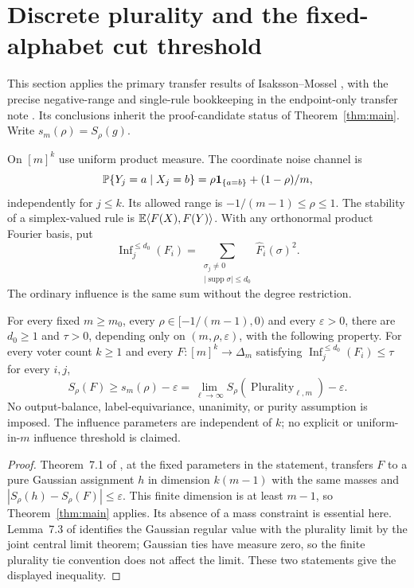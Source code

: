 \section{Discrete plurality and the fixed-alphabet cut threshold}
\label{sec:discrete}
This section applies the primary transfer results of Isaksson--Mossel
\cite{IM}, with the precise negative-range and single-rule bookkeeping
in the endpoint-only transfer note \cite{endpointtransfer}. Its conclusions inherit the
proof-candidate status of Theorem~\ref{thm:main}.
Write $s_m(\rho)=S_\rho(g)$.

On $[m]^k$ use uniform product measure. The coordinate noise channel is
\begin{equation}\label{eq:discrete-channel}
 \mathbb P\{Y_j=a\mid X_j=b\}
       =\rho\mathbf 1_{\{a=b\}}+(1-\rho)/m,
\end{equation}
independently for $j\le k$. Its allowed range is
$-1/(m-1)\le\rho\le1$. The stability of a simplex-valued rule is
$\mathbb E\langle F(X),F(Y)\rangle$. With any orthonormal product Fourier basis, put
\[
 \operatorname{Inf}^{\le d_0}_j(F_i)
  =\sum_{\substack{\sigma_j\ne0\\|\operatorname{supp}\sigma|\le d_0}}
                   \widehat F_i(\sigma)^2.
\]
The ordinary influence is the same sum without the degree restriction.

\begin{corollary}\label{cor:plurality}
For every fixed $m\ge m_0$, every $\rho\in[-1/(m-1),0)$ and every
$\varepsilon>0$, there are $d_0\ge1$ and $\tau>0$, depending only on
$(m,\rho,\varepsilon)$, with the following property. For every voter
count $k\ge1$ and every $F:[m]^k\to\Delta_m$ satisfying
$\operatorname{Inf}^{\le d_0}_j(F_i)\le\tau$ for every $i,j$,
\[
 S_\rho(F)\ge s_m(\rho)-\varepsilon
   =\lim_{\ell\to\infty}S_\rho(\operatorname{Plurality}_{\ell,m})
       -\varepsilon.
\]
No output-balance, label-equivariance, unanimity, or purity assumption
is imposed. The influence parameters are independent of $k$; no
explicit or uniform-in-$m$ influence threshold is claimed.
\end{corollary}
\begin{proof}
Theorem~7.1 of \cite{IM}, at the fixed parameters in the statement,
transfers $F$ to a pure Gaussian assignment $h$ in dimension
$k(m-1)$ with the same masses and
$|S_\rho(h)-S_\rho(F)|\le\varepsilon$.
This finite dimension is at least $m-1$, so Theorem~\ref{thm:main}
applies. Its absence of a mass constraint is essential here.
Lemma~7.3 of \cite{IM} identifies the Gaussian regular value with the
plurality limit by the joint central limit theorem; Gaussian ties have
measure zero, so the finite plurality tie convention does not affect
the limit. These two statements give the displayed inequality.
\end{proof}

